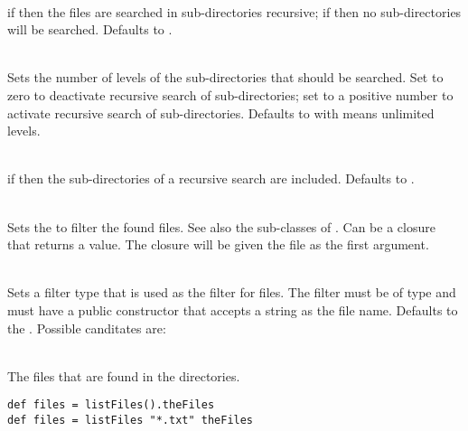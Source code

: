 \begin{asparadesc}
%
\item[\code{recursive: true|false}] \hfill \\
if  then the files are searched in sub-directories recursive;
if  then no sub-directories will be searched. Defaults to .
%
\item[\code{depth: (+)number|-1}] \hfill \\
Sets the number of levels of the sub-directories that should be searched.
Set to zero to deactivate recursive search of sub-directories; set to a positive
number to activate recursive search of sub-directories.
Defaults to  with means unlimited levels.
%
\item[\code{includeSubDirectories: true|false}] \hfill \\
if  then the sub-directories of a recursive search are included.
Defaults to .
%
\item[\code{filter: FileFilter|closure}] \hfill \\
Sets the \cite{filefilter13} to filter the found files.
See also the sub-classes of \cite{abstractfilefilter13}.
Can be a closure that returns a  value. The closure will be given
the file\cite{file13} as the first argument.
%
\item[\code{filterType: class}] \hfill \\
Sets a filter type that is used as the filter for files. The filter 
must be of type \cite{filefilter13} and must have
a public constructor that accepts a string as the file name. Defaults
to the \cite{wildcardfilefilter13}. Possible canditates
are:
\begin{compactitem}
\item {}
\item {}
\item {}
\item {}
\item {}
\end{compactitem}
%
\item[\code{theFiles}] \hfill \\
The files that are found in the directories.
%
\end{asparadesc}

\begin{lstlisting}[style=Groovybash, label={lst:example_listFiles_simple}, title={%
List files in the current working directory.}]
def files = listFiles().theFiles
def files = listFiles "*.txt" theFiles
\end{lstlisting}

